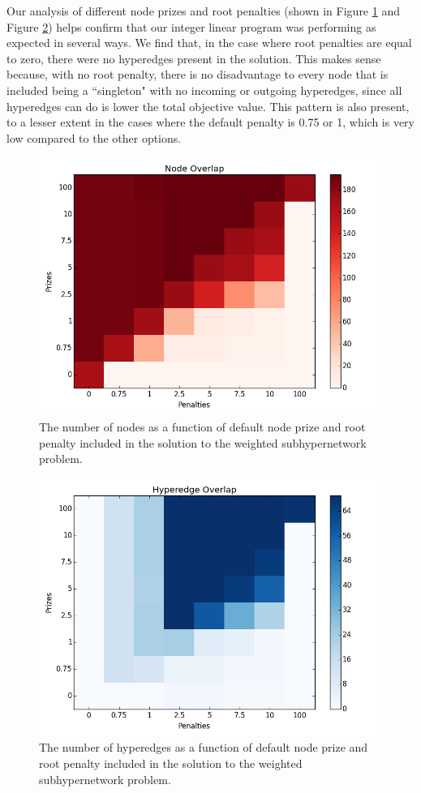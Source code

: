 \documentclass[12pt,twoside]{reedthesis}
\theoremstyle{definition}
\begin{document}
   Our analysis of different node prizes and root penalties (shown in Figure \ref{fig:Hh_nodes} and Figure \ref{fig:Hh_hyperedges}) helps confirm that our integer linear program was performing as expected in several ways. We find that, in the case where root penalties are equal to zero, there were no hyperedges present in the solution. This makes sense because, with no root penalty, there is no disadvantage to every node that is included being a ``singleton" with no incoming or outgoing hyperedges, since all hyperedges can do is lower the total objective value. This pattern is also present, to a lesser extent in the cases where the default penalty is 0.75 or 1, which is very low compared to the other options. \par

   \begin{figure}
     \centering
     \includegraphics[width=0.8\linewidth]{Hh_nodes}
     \caption{The number of nodes as a function of default node prize and root penalty included in the solution to the weighted subhypernetwork problem. }
     \label{fig:Hh_nodes}
   \end{figure}%

   \begin{figure}
     \centering
     \includegraphics[width=0.8\linewidth]{Hh_hyperedges}
     \caption{The number of hyperedges as a function of default node prize and root penalty included in the solution to the weighted subhypernetwork problem.}
     \label{fig:Hh_hyperedges}
   \end{figure}
\end{document}
